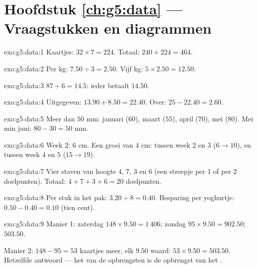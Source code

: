 \section*{Hoofdstuk \ref{ch:g5:data} --- Vraagstukken en diagrammen}

\begin{solution}{exo:g5:data:1}
Kaartjes: $32 \times 7 = 224$. Totaal: $240 + 224 = 464$.
\end{solution}

\begin{solution}{exo:g5:data:2}
Per kg: $7.50 \div 3 = 2.50$. Vijf kg: $5 \times 2.50 = 12.50$.
\end{solution}

\begin{solution}{exo:g5:data:3}
$87 \div 6 = 14.5$: ieder betaalt $14.50$.
\end{solution}

\begin{solution}{exo:g5:data:4}
Uitgegeven: $13.90 + 8.50 = 22.40$. Over: $25 - 22.40 = 2.60$.
\end{solution}

\begin{solution}{exo:g5:data:5}
Meer dan $50$ mm: januari ($60$), maart ($55$), april ($70$), mei ($80$). Mei
min juni: $80 - 30 = 50$ mm.
\end{solution}

\begin{solution}{exo:g5:data:6}
Week $2$: $6$ cm. Een groei van $4$ cm: tussen week $2$ en $3$
($6 \to 10$), en tussen week $4$ en $5$ ($15 \to 19$).
\end{solution}

\begin{solution}{exo:g5:data:7}
Vier staven van hoogte $4$, $7$, $3$ en $6$ (een streepje per $1$ of per $2$
doelpunten). Totaal: $4 + 7 + 3 + 6 = 20$ doelpunten.
\end{solution}

\begin{solution}{exo:g5:data:8}
Per stuk in het pak: $3.20 \div 8 = 0.40$. Besparing per yoghurtje:
$0.50 - 0.40 = 0.10$ (tien cent).
\end{solution}

\begin{solution}{exo:g5:data:9}
Manier 1: zaterdag $148 \times 9.50 = 1\,406$; zondag
$95 \times 9.50 = 902.50$;  $503.50$.

Manier 2: $148 - 95 = 53$ kaartjes meer, elk $9.50$ waard:
$53 \times 9.50 = 503.50$. Hetzelfde antwoord --- het  van de
opbrengsten is de opbrengst van het .
\end{solution}

